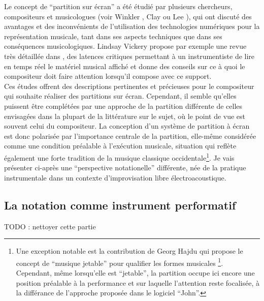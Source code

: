 \indent Le concept de ``partition sur écran'' a été étudié par plusieurs chercheurs, compositeurs et musicologues (voir Winkler \cite{winkler_real-time_2004}, Clay \cite{adams_inventing_2008} ou Lee \cite{lee_real-time_2012}), qui ont discuté des avantages et des inconvénients de l'utilisation des technologies numériques pour la représentation musicale, tant dans ses aspects techniques que dans ses conséquences musicologiques. Lindsay Vickery propose par exemple une revue très détaillée dans \cite{vickery_limitations_2014}, des latences critiques permettant à un instrumentiste de lire en temps réel le matériel musical affiché et donne des conseils sur ce à quoi le compositeur doit faire attention lorsqu'il compose avec ce support.\\
\indent Ces études offrent des descriptions pertinentes et précieuses pour le compositeur qui souhaite réaliser des partitions sur écran. Cependant, il semble qu'elles puissent être complétées par une approche de la partition différente de celles envisagées dans la plupart de la littérature sur le sujet, où le point de vue est souvent celui du compositeur. La conception d'un système de partition à écran est donc polarisée par l'importance centrale de la partition, elle-même considérée comme une condition préalable à l'exécution musicale, situation qui reflète également une forte tradition de la musique classique occidentale\footnote{Une exception notable est la contribution de Georg Hajdu \cite{hajdu_disposable_2016} qui propose le concept de ``musique jetable'' pour qualifier les formes musicales \footnote{}. Cependant, même lorsqu'elle est ``jetable'', la partition occupe ici encore une position préalable à la performance et sur laquelle l'attention reste focalisée, à la différance de l'approche proposée dans le logiciel ``John''.}. Je vais présenter ci-après une ``perspective notationelle'' différente, née de la pratique instrumentale dans un contexte d'improvisation libre électroacoustique.


\subsection{La notation comme instrument performatif}
TODO : nettoyer cette partie

